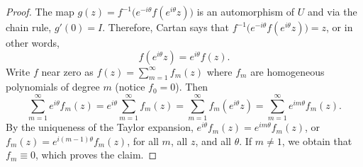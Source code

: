 \documentclass[12pt,openany]{book}
\theoremstyle{plain}
\theoremstyle{remark}
\theoremstyle{definition}
\theoremstyle{exercise}
\theoremstyle{example}
\begin{document}
\begin{proof}
The map $g(z) = f^{-1}\bigl(e^{-i\theta}f(e^{i\theta} z)\bigr)$ is an
automorphism of $U$ and via the
chain rule, $g'(0) = I$.  Therefore,
Cartan says that
$f^{-1}\bigl(e^{-i\theta}f(e^{i\theta} z)\bigr) = z$, or in other words,
\begin{equation*}
f(e^{i\theta} z) = e^{i\theta}f(z) .
\end{equation*}
Write $f$ near zero as $f(z) = \sum_{m=1}^\infty f_m(z)$ where $f_m$ are
homogeneous polynomials of degree $m$ (notice $f_0 = 0$).  Then
\begin{equation*}
\sum_{m=1}^\infty e^{i\theta} f_m(z)
=
e^{i\theta} \sum_{m=1}^\infty f_m(z)
=
\sum_{m=1}^\infty f_m(e^{i\theta} z)
=
\sum_{m=1}^\infty e^{im\theta}f_m(z) .
\end{equation*}
By the uniqueness of the Taylor expansion,
$e^{i\theta} f_m(z)  = e^{im\theta} f_m(z)$, or
$f_m(z)  = e^{i(m-1)\theta} f_m(z)$,
for all $m$, all $z$, and all $\theta$.
If $m\not=1$, we obtain that $f_m \equiv
0$, which proves the claim.
\end{proof}
\end{document}
